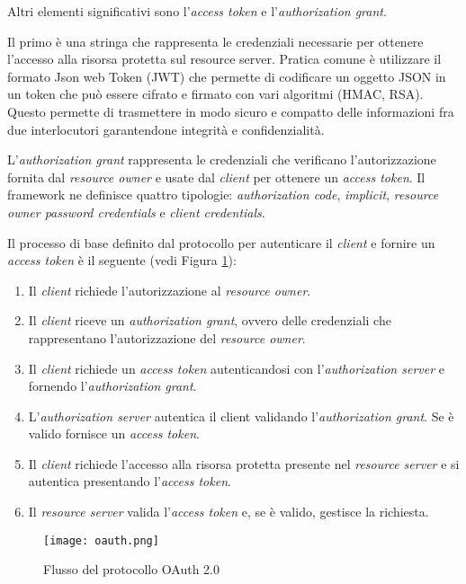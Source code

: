 Altri elementi significativi sono l'\textit{access token} e l'\textit{authorization grant}.

Il primo è una stringa che rappresenta le credenziali necessarie per ottenere l'accesso alla risorsa protetta sul resource server.
Pratica comune è utilizzare il formato Json web Token \cite{rfc7519} (JWT) che permette di codificare un oggetto JSON in un token
che può essere cifrato e firmato con vari algoritmi (HMAC, RSA). Questo permette di trasmettere in modo sicuro e compatto delle informazioni
fra due interlocutori garantendone integrità e confidenzialità.

L'\textit{authorization grant} rappresenta le credenziali che verificano l'autorizzazione fornita dal \textit{resource owner} e usate dal \textit{client} per ottenere un \textit{access token}.
Il framework ne definisce quattro tipologie: \textit{authorization code}, \textit{implicit}, \textit{resource owner password credentials} e \textit{client credentials}.

Il processo di base definito dal protocollo per autenticare il \textit{client} e fornire un \textit{access token} è il seguente (vedi Figura \ref{fig:OAuth2.0}):
\begin{enumerate}
    \itemsep0em
    \item Il \textit{client} richiede l'autorizzazione al \textit{resource owner}.
    \item Il \textit{client} riceve un \textit{authorization grant}, ovvero delle credenziali che rappresentano l'autorizzazione del \textit{resource owner}.
    \item Il \textit{client} richiede un \textit{access token} autenticandosi con l'\textit{authorization server} e fornendo l'\textit{authorization grant}.
    \item L'\textit{authorization server} autentica il client validando l'\textit{authorization grant}. Se è valido fornisce un \textit{access token}.
    \item Il \textit{client} richiede l'accesso alla risorsa protetta presente nel \textit{resource server} e si autentica presentando l'\textit{access token}.
    \item Il \textit{resource server} valida l'\textit{access token} e, se è valido, gestisce la richiesta.
\end{enumerate}

\begin{figure}[H]
    \centering
    \texttt{[image: oauth.png]}
    \caption{Flusso del protocollo OAuth 2.0}
    \label{fig:OAuth2.0}
\end{figure}


